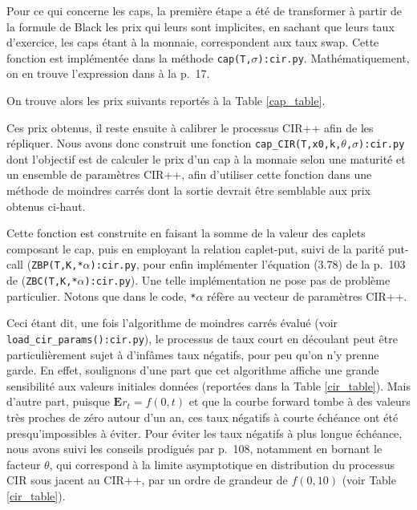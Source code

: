 Pour ce qui concerne les caps, la première étape a été de transformer à partir de la
formule de Black les prix qui leurs sont implicites, en sachant que leurs taux d'exercice,
les caps étant à la monnaie, correspondent aux taux swap. Cette fonction est implémentée
dans la méthode \verb+cap(T,+$\sigma$\verb+):cir.py+. Mathématiquement, on en trouve
l'expression dans \cite{brigo} à la p.~17.

On trouve alors les prix suivants reportés à la Table \ref{cap_table}.
\begin{table}
  \centering
  \caption{}
  \label{cap_table}

\end{table}

Ces prix obtenus, il reste ensuite à calibrer le processus CIR++ afin de les
répliquer. Nous avons donc construit une fonction
\verb+cap_CIR(T,x0,k,+$\theta$\verb+,+$\sigma$\verb+):cir.py+ dont l'objectif est de
calculer le prix d'un cap à la monnaie selon une maturité et un ensemble de paramètres
CIR++, afin d'utiliser cette fonction dans une méthode de moindres carrés dont la sortie
devrait être semblable aux prix obtenus ci-haut.

Cette fonction est construite en faisant la somme de la valeur des caplets composant le
cap, puis en employant la relation caplet-put, suivi de la parité put-call
(\verb+ZBP(T,K,*+$\alpha$\verb+):cir.py+, pour enfin implémenter l'équation (3.78) de la
p.~103 de \cite{brigo} (\verb+ZBC(T,K,*+$\alpha$\verb+):cir.py+). Une telle implémentation
ne pose pas de problème particulier. Notons que dans le code, \verb+*+$\alpha$ réfère au
vecteur de paramètres CIR++.

Ceci étant dit, une fois l'algorithme de moindres carrés évalué (voir
\verb+load_cir_params():cir.py+), le processus de taux court en découlant peut être
particulièrement sujet à d'infâmes taux négatifs, pour peu qu'on n'y prenne garde. En
effet, soulignons d'une part que cet algorithme affiche une grande sensibilité aux valeurs
initiales données (reportées dans la Table \ref{cir_table}). Mais d'autre part, puisque
$\bm E r_t = f(0,t)$ et que la courbe forward tombe à des valeurs très proches de zéro
autour d'un an, ces taux négatifs à courte échéance ont été presqu'impossibles à
éviter. Pour éviter les taux négatifs à plus longue échéance, nous avons suivi les
conseils prodigués par \cite{brigo} p.~108, notamment en bornant le facteur $\theta$, qui
correspond à la limite asymptotique en distribution du processus CIR sous jacent au CIR++,
par un ordre de grandeur de $f(0,10)$ (voir Table \ref{cir_table}).

